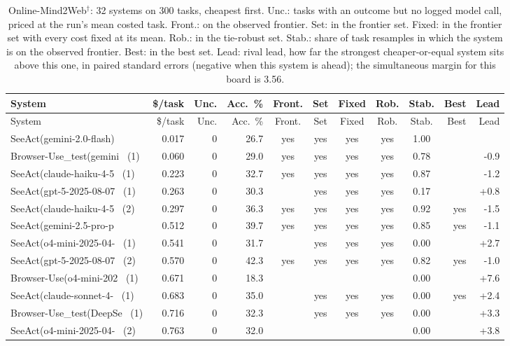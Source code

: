 {\begin{longtable}{lrrrcccccrr}
\caption{Online-Mind2Web$^{\dagger}$: 32 systems on 300 tasks, cheapest first. Unc.: tasks with an outcome but no logged model call, priced at the run's mean costed task. Front.: on the observed frontier. Set: in the frontier set. Fixed: in the frontier set with every cost fixed at its mean. Rob.: in the tie-robust set. Stab.: share of task resamples in which the system is on the observed frontier. Best: in the best set. Lead: rival lead, how far the strongest cheaper-or-equal system sits above this one, in paired standard errors (negative when this system is ahead); the simultaneous margin for this board is 3.56.}\label{tab:supp-hal_online_mind2web}\\
\toprule
System & \$/task & Unc. & Acc.\ \% & Front. & Set & Fixed & Rob. & Stab. & Best & Lead \\
\midrule
\endfirsthead
\toprule
System & \$/task & Unc. & Acc.\ \% & Front. & Set & Fixed & Rob. & Stab. & Best & Lead \\
\midrule
\endhead
\bottomrule
\endfoot
SeeAct(gemini-2.0-flash) & 0.017 & 0 & 26.7 & yes & yes & yes & yes & 1.00 &  &  \\
Browser-Use\_test(gemini~ (1) & 0.060 & 0 & 29.0 & yes & yes & yes & yes & 0.78 &  & -0.9 \\
SeeAct(claude-haiku-4-5~ (1) & 0.223 & 0 & 32.7 & yes & yes & yes & yes & 0.87 &  & -1.2 \\
SeeAct(gpt-5-2025-08-07~ (1) & 0.263 & 0 & 30.3 &  & yes & yes & yes & 0.17 &  & +0.8 \\
SeeAct(claude-haiku-4-5~ (2) & 0.297 & 0 & 36.3 & yes & yes & yes & yes & 0.92 & yes & -1.5 \\
SeeAct(gemini-2.5-pro-p~ & 0.512 & 0 & 39.7 & yes & yes & yes & yes & 0.85 & yes & -1.1 \\
SeeAct(o4-mini-2025-04-~ (1) & 0.541 & 0 & 31.7 &  & yes & yes & yes & 0.00 &  & +2.7 \\
SeeAct(gpt-5-2025-08-07~ (2) & 0.570 & 0 & 42.3 & yes & yes & yes & yes & 0.82 & yes & -1.0 \\
Browser-Use(o4-mini-202~ (1) & 0.671 & 0 & 18.3 &  &  &  &  & 0.00 &  & +7.6 \\
SeeAct(claude-sonnet-4-~ (1) & 0.683 & 0 & 35.0 &  & yes & yes & yes & 0.00 & yes & +2.4 \\
Browser-Use\_test(DeepSe~ (1) & 0.716 & 0 & 32.3 &  & yes & yes & yes & 0.00 &  & +3.3 \\
SeeAct(o4-mini-2025-04-~ (2) & 0.763 & 0 & 32.0 &  &  &  &  & 0.00 &  & +3.8 \\

\end{longtable}}
